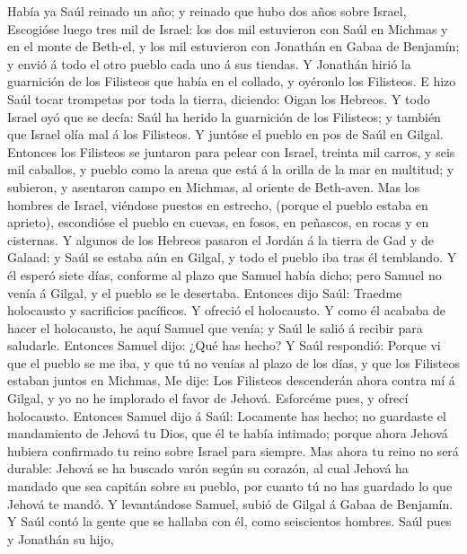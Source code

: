  Había ya Saúl reinado un año; y reinado que hubo dos años
sobre Israel,  Escogióse luego tres mil de Israel: los dos
mil estuvieron con Saúl en Michmas y en el monte de Beth-el, y los mil
estuvieron con Jonathán en Gabaa de Benjamín; y envió á todo el otro
pueblo cada uno á sus tiendas.  Y Jonathán hirió la
guarnición de los Filisteos que había en el collado, y oyéronlo los
Filisteos. E hizo Saúl tocar trompetas por toda la tierra, diciendo:
Oigan los Hebreos.  Y todo Israel oyó que se decía: Saúl
ha herido la guarnición de los Filisteos; y también que Israel olía mal
á los Filisteos. Y juntóse el pueblo en pos de Saúl en Gilgal.
 Entonces los Filisteos se juntaron para pelear con
Israel, treinta mil carros, y seis mil caballos, y pueblo como la arena
que está á la orilla de la mar en multitud; y subieron, y asentaron
campo en Michmas, al oriente de Beth-aven.  Mas los
hombres de Israel, viéndose puestos en estrecho, (porque el pueblo
estaba en aprieto), escondióse el pueblo en cuevas, en fosos, en
peñascos, en rocas y en cisternas.  Y algunos de los
Hebreos pasaron el Jordán á la tierra de Gad y de Galaad: y Saúl se
estaba aún en Gilgal, y todo el pueblo iba tras él temblando.
 Y él esperó siete días, conforme al plazo que Samuel
había dicho; pero Samuel no venía á Gilgal, y el pueblo se le desertaba.
 Entonces dijo Saúl: Traedme holocausto y sacrificios
pacíficos. Y ofreció el holocausto.  Y como él acababa de
hacer el holocausto, he aquí Samuel que venía; y Saúl le salió á recibir
para saludarle.  Entonces Samuel dijo: ¿Qué has hecho? Y
Saúl respondió: Porque vi que el pueblo se me iba, y que tú no venías al
plazo de los días, y que los Filisteos estaban juntos en Michmas,
 Me dije: Los Filisteos descenderán ahora contra mí á
Gilgal, y yo no he implorado el favor de Jehová. Esforcéme pues, y
ofrecí holocausto.  Entonces Samuel dijo á Saúl:
Locamente has hecho; no guardaste el mandamiento de Jehová tu Dios, que
él te había intimado; porque ahora Jehová hubiera confirmado tu reino
sobre Israel para siempre.  Mas ahora tu reino no será
durable: Jehová se ha buscado varón según su corazón, al cual Jehová ha
mandado que sea capitán sobre su pueblo, por cuanto tú no has guardado
lo que Jehová te mandó.  Y levantándose Samuel, subió de
Gilgal á Gabaa de Benjamín. Y Saúl contó la gente que se hallaba con él,
como seiscientos hombres.  Saúl pues y Jonathán su hijo,
